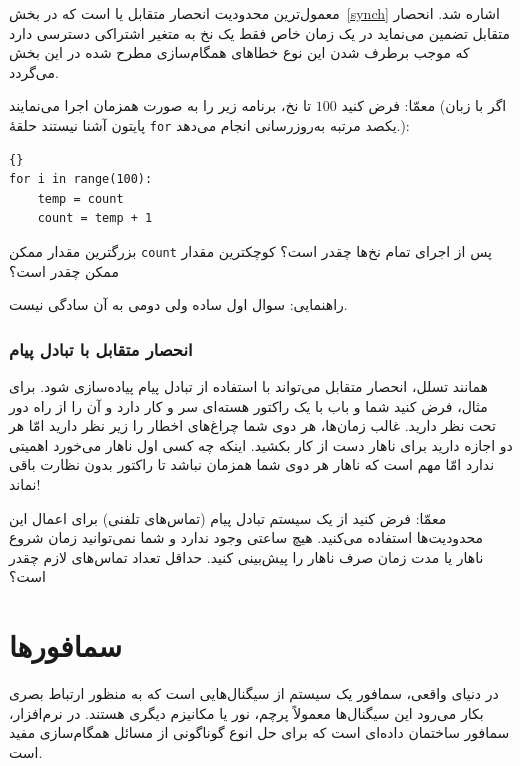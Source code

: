 \documentclass{book}
\newcommand{\clearemptydoublepage}{}%
\begin{document}
    معمول‌ترین محدودیت انحصار متقابل یا  است که 
    در بخش~\ref{synch}  اشاره شد. انحصار متقابل تضمین می‌نماید در یک زمان خاص  فقط یک نخ به متغیر اشتراکی دسترسی دارد 
    که موجب برطرف شدن این نوع خطاهای همگام‌سازی مطرح شده در این بخش می‌گردد. 
    
    معمّا: فرض کنید $100$ تا نخ، برنامه زیر را به صورت همزمان اجرا می‌نمایند (اگر با زبان پایتون آشنا نیستند حلقهٔ \texttt{for} یکصد مرتبه 
    به‌روزرسانی انجام می‌دهد.):

\begin{latin}
\begin{lstlisting}[]{}
for i in range(100):
    temp = count
    count = temp + 1
\end{lstlisting}
\end{latin}

    بزرگترین مقدار ممکن \texttt{count} پس از اجرای تمام نخ‌ها چقدر است؟ کوچکترین مقدار ممکن چقدر است؟ 
    

    راهنمایی: سوال اول ساده ولی دومی به آن سادگی نیست. 

\subsection {انحصار متقابل با تبادل پیام}


    همانند تسلل، انحصار متقابل می‌تواند با استفاده از تبادل پیام پیاده‌سازی شود. برای مثال، فرض کنید شما و باب 
    با یک راکتور هسته‌ای سر و کار دارد و آن را از راه دور تحت نظر دارید. غالب زمان‌ها، هر دوی شما چراغ‌های اخطار را زیر نظر دارید 
    امّا هر دو اجازه دارید برای ناهار  دست از کار بکشید. 
    اینکه چه کسی اول ناهار می‌خورد اهمیتی ندارد امّا مهم است که ناهار هر دوی شما همزمان نباشد تا راکتور بدون نظارت باقی نماند!

    معمّا: فرض کنید از یک سیستم تبادل پیام (تماس‌های تلفنی) برای اعمال این محدودیت‌ها استفاده می‌کنید. 
    هیچ ساعتی وجود ندارد و شما نمی‌توانید زمان شروع ناهار یا مدت زمان صرف ناهار را پیش‌بینی کنید. 
    حداقل تعداد تماس‌های لازم چقدر است؟
    
\clearemptydoublepage
\chapter{سمافورها}

    در دنیای واقعی، سمافور یک سیستم از سیگنال‌هایی است که به منظور ارتباط بصری بکار می‌رود این سیگنال‌ها معمولاً پرچم،‌ نور یا مکانیزم دیگری هستند. 
    در نرم‌افزار، سمافور ساختمان داده‌ای است که برای حل انوع گوناگونی از مسائل همگام‌سازی مفید است.
\end{document}
